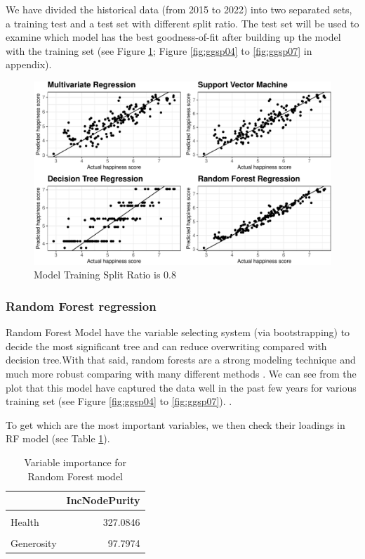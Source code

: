 \documentclass[11pt,a4paper,]{article}
\begin{document}
We have divided the historical data (from 2015 to 2022) into two separated sets, a training test and a test set with different split ratio. The test set will be used to examine which model has the best goodness-of-fit after building up the model with the training set (see Figure \ref{fig:training}; Figure \ref{fig:ggsp04} to \ref{fig:ggsp07} in appendix).

\newpage

\begin{figure}
\centering
\includegraphics{Assignment4_files/figure-latex/training-1.pdf}
\caption{\label{fig:training}Model Training Split Ratio is 0.8}
\end{figure}

\hypertarget{random-forest-regression}{%
\subsubsection{Random Forest regression}\label{random-forest-regression}}

Random Forest Model have the variable selecting system (via bootstrapping) to decide the most significant tree and can reduce overwriting compared with decision tree.With that said, random forests are a strong modeling technique and much more robust comparing with many different methods \autocite{liberman2017}. We can see from the plot that this model have captured the data well in the past few years for various training set (see Figure \ref{fig:ggsp04} to \ref{fig:ggsp07}). .

To get which are the most important variables, we then check their loadings in RF model (see Table \ref{tab:varimp}).

\newpage
\begin{table}

\caption{\label{tab:varimp}Variable importance for Random Forest model}
\centering
\begin{tabular}[t]{l|r}
\hline
  & IncNodePurity\\
\hline
\cellcolor{gray!6}{Economy} & \cellcolor{gray!6}{348.6690}\\
\hline
Health & 327.0846\\
\hline
\cellcolor{gray!6}{Freedom} & \cellcolor{gray!6}{169.3299}\\
\hline
Generosity & 97.7974\\
\hline
\end{tabular}
\end{table}
\end{document}
